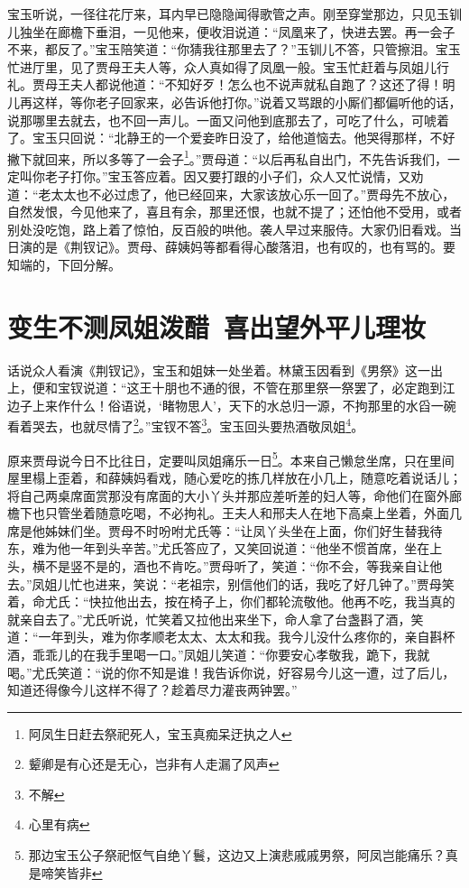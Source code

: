 \documentclass[12pt,oneside]{book}
\begin{document}
宝玉听说，一径往花厅来，耳内早已隐隐闻得歌管之声。刚至穿堂那边，只见玉钏儿独坐在廊檐下垂泪，一见他来，便收泪说道：“凤凰来了，快进去罢。再一会子不来，都反了。”宝玉陪笑道：“你猜我往那里去了？”玉钏儿不答，只管擦泪。宝玉忙进厅里，见了贾母王夫人等，众人真如得了凤凰一般。宝玉忙赶着与凤姐儿行礼。贾母王夫人都说他道：“不知好歹！怎么也不说声就私自跑了？这还了得！明儿再这样，等你老子回家来，必告诉他打你。”说着又骂跟的小厮们都偏听他的话，说那哪里去就去，也不回一声儿。一面又问他到底那去了，可吃了什么，可唬着了。宝玉只回说：“北静王的一个爱妾昨日没了，给他道恼去。他哭得那样，不好撇下就回来，所以多等了一会子\footnote{阿凤生日赶去祭祀死人，宝玉真痴呆迂执之人}。”贾母道：“以后再私自出门，不先告诉我们，一定叫你老子打你。”宝玉答应着。因又要打跟的小子们，众人又忙说情，又劝道：“老太太也不必过虑了，他已经回来，大家该放心乐一回了。”贾母先不放心，自然发恨，今见他来了，喜且有余，那里还恨，也就不提了；还怕他不受用，或者别处没吃饱，路上着了惊怕，反百般的哄他。袭人早过来服侍。大家仍旧看戏。当日演的是《荆钗记》。贾母、薛姨妈等都看得心酸落泪，也有叹的，也有骂的。要知端的，下回分解。
 

\chapter{变生不测凤姐泼醋~喜出望外平儿理妆}
话说众人看演《荆钗记》，宝玉和姐妹一处坐着。林黛玉因看到《男祭》这一出上，便和宝钗说道：“这王十朋也不通的很，不管在那里祭一祭罢了，必定跑到江边子上来作什么！俗语说，‘睹物思人’，天下的水总归一源，不拘那里的水舀一碗看着哭去，也就尽情了\footnote{颦卿是有心还是无心，岂非有人走漏了风声}。”宝钗不答\footnote{不解}。宝玉回头要热酒敬凤姐\footnote{心里有病}。

原来贾母说今日不比往日，定要叫凤姐痛乐一日\footnote{那边宝玉公子祭祀怄气自绝丫鬟，这边又上演悲戚戚男祭，阿凤岂能痛乐？真是啼笑皆非}。本来自己懒怠坐席，只在里间屋里榻上歪着，和薛姨妈看戏，随心爱吃的拣几样放在小几上，随意吃着说话儿；将自己两桌席面赏那没有席面的大小丫头并那应差听差的妇人等，命他们在窗外廊檐下也只管坐着随意吃喝，不必拘礼。王夫人和邢夫人在地下高桌上坐着，外面几席是他姊妹们坐。贾母不时吩咐尤氏等：“让凤丫头坐在上面，你们好生替我待东，难为他一年到头辛苦。”尤氏答应了，又笑回说道：“他坐不惯首席，坐在上头，横不是竖不是的，酒也不肯吃。”贾母听了，笑道：“你不会，等我亲自让他去。”凤姐儿忙也进来，笑说：“老祖宗，别信他们的话，我吃了好几钟了。”贾母笑着，命尤氏：“快拉他出去，按在椅子上，你们都轮流敬他。他再不吃，我当真的就亲自去了。”尤氏听说，忙笑着又拉他出来坐下，命人拿了台盏斟了酒，笑道：“一年到头，难为你孝顺老太太、太太和我。我今儿没什么疼你的，亲自斟杯酒，乖乖儿的在我手里喝一口。”凤姐儿笑道：“你要安心孝敬我，跪下，我就喝。”尤氏笑道：“说的你不知是谁！我告诉你说，好容易今儿这一遭，过了后儿，知道还得像今儿这样不得了？趁着尽力灌丧两钟罢。”
\end{document}
